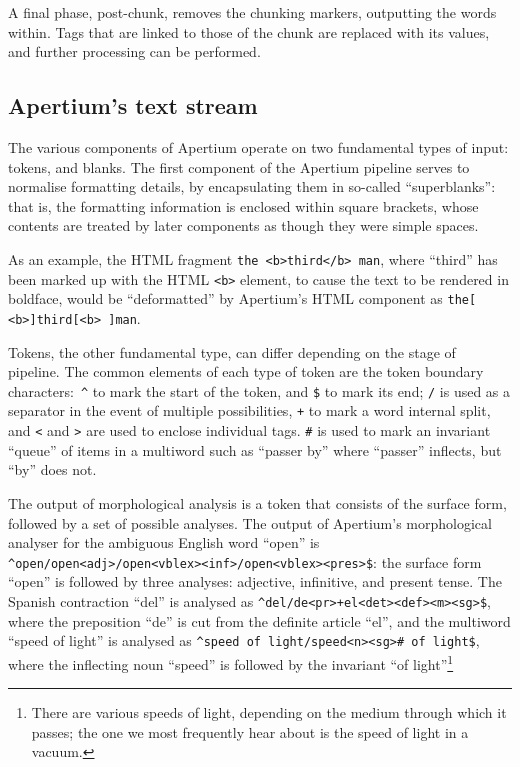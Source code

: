 A final phase, post-chunk, removes the chunking markers, outputting the words within. Tags
that are linked to those of the chunk are replaced with its values, and further
processing can be performed.


\subsection{Apertium's text stream}
\label{ssect:textstream}

The various components of Apertium operate on two fundamental types of input:
tokens, and blanks. The first component of the Apertium pipeline serves to
normalise formatting details, by encapsulating them in so-called ``superblanks'':
that is, the formatting information is enclosed within square brackets, whose 
contents are treated by later components as though they were simple spaces.

As an example, the HTML fragment \texttt{the <b>third</b> man}, where ``third''
has been marked up with the HTML \texttt{<b>} element, to cause the text to
be rendered in boldface, would be ``deformatted'' by Apertium's HTML component
as \texttt{the[ <b>]third[<\/b> ]man}.

Tokens, the other fundamental type, can differ depending on the stage of pipeline.
The common elements of each type of token are the token boundary characters:~\texttt{\^{}}
to mark the start of the token, and \texttt{\$} to mark its end; \texttt{/} is used as a
separator in the event of multiple possibilities, \texttt{+} to mark a word internal split,
and \texttt{<} and \texttt{>} are used to enclose individual tags. \texttt{\#} is used
to mark an invariant ``queue'' of items in a multiword such as ``passer by'' where
``passer'' inflects, but ``by'' does not.

The output of morphological analysis is a token that consists of the surface form, followed
by a set of possible analyses. The output of Apertium's morphological analyser for the 
ambiguous English word ``open'' is \\ \texttt{\^{}open/open<adj>/open<vblex><inf>/open<vblex><pres>\$}:
the surface form ``open'' is followed by three analyses: adjective, infinitive, and present tense.
The Spanish contraction ``del'' is analysed as \texttt{\^{}del/de<pr>+el<det><def><m><sg>\$}, where
the preposition ``de'' is cut from the definite article ``el'', and the multiword ``speed of light''
is analysed as \texttt{\^{}speed of light/speed<n><sg>\# of light\$}, where the inflecting noun
``speed'' is followed by the invariant ``of light''\footnote{There are various speeds of light,
depending on the medium through which it passes; the one we  most frequently hear about is the speed 
of light in a vacuum.}

